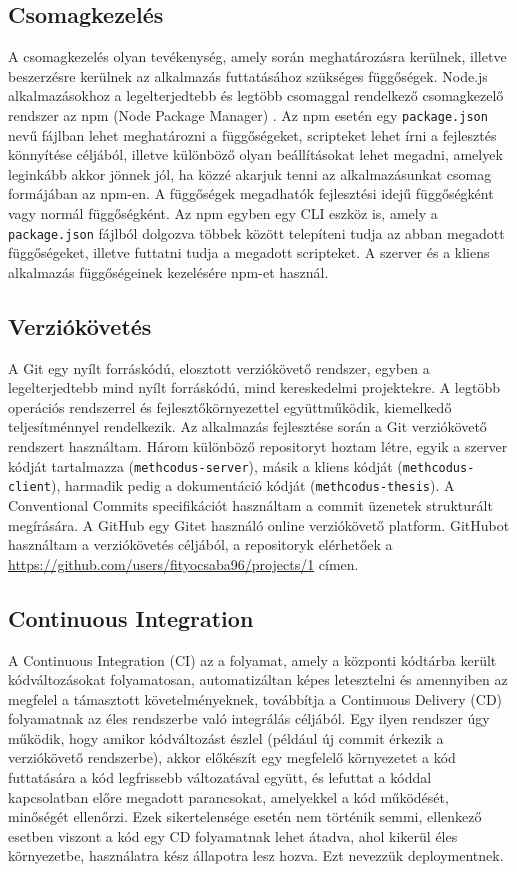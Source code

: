 \documentclass{elteikthesis}
\begin{document}
			\subsection{Csomagkezelés}
				A csomagkezelés olyan tevékenység, amely során meghatározásra kerülnek, illetve beszerzésre kerülnek az alkalmazás futtatásához szükséges függőségek. Node.js alkalmazásokhoz a legelterjedtebb és legtöbb csomaggal rendelkező csomagkezelő rendszer az npm (Node Package Manager) \cite{npm}. Az npm esetén egy \texttt{package.json} nevű fájlban lehet meghatározni a függőségeket, scripteket lehet írni a fejlesztés könnyítése céljából, illetve különböző olyan beállításokat lehet megadni, amelyek leginkább akkor jönnek jól, ha közzé akarjuk tenni az alkalmazásunkat csomag formájában az npm-en. A függőségek megadhatók fejlesztési idejű függőségként vagy normál függőségként. Az npm egyben egy CLI eszköz is, amely a \texttt{package.json} fájlból dolgozva többek között telepíteni tudja az abban megadott függőségeket, illetve futtatni tudja a megadott scripteket. A szerver és a kliens alkalmazás függőségeinek kezelésére npm-et használ.
			
			\subsection{Verziókövetés}
				A Git \cite{git} egy nyílt forráskódú, elosztott verziókövető rendszer, egyben a legelterjedtebb mind nyílt forráskódú, mind kereskedelmi projektekre. A legtöbb operációs rendszerrel és fejlesztőkörnyezettel együttműködik, kiemelkedő teljesítménnyel rendelkezik.	Az alkalmazás fejlesztése során a Git verziókövető rendszert használtam. Három különböző repositoryt hoztam létre, egyik a szerver kódját tartalmazza (\texttt{methcodus-server}), másik a kliens kódját (\texttt{methcodus-client}), harmadik pedig a dokumentáció kódját (\texttt{methcodus-thesis}). A Conventional Commits specifikációt használtam a commit üzenetek strukturált megírására. A GitHub egy Gitet használó online verziókövető platform. GitHubot használtam a verziókövetés céljából, a repositoryk elérhetőek a \url{https://github.com/users/fityocsaba96/projects/1} címen.
			
			\subsection{Continuous Integration}
				A Continuous Integration (CI) \cite{ci} az a folyamat, amely a központi kódtárba került kódváltozásokat folyamatosan, automatizáltan képes letesztelni és amennyiben az megfelel a támasztott követelményeknek, továbbítja a Continuous Delivery (CD) folyamatnak az éles rendszerbe való integrálás céljából. Egy ilyen rendszer úgy működik, hogy amikor kódváltozást észlel (például új commit érkezik a verziókövető rendszerbe), akkor előkészít egy megfelelő környezetet a kód futtatására a kód legfrissebb változatával együtt, és lefuttat a kóddal kapcsolatban előre megadott parancsokat, amelyekkel a kód működését, minőségét ellenőrzi. Ezek sikertelensége esetén nem történik semmi, ellenkező esetben viszont a kód egy CD folyamatnak lehet átadva, ahol kikerül éles környezetbe, használatra kész állapotra lesz hozva. Ezt nevezzük deploymentnek.
\end{document}
